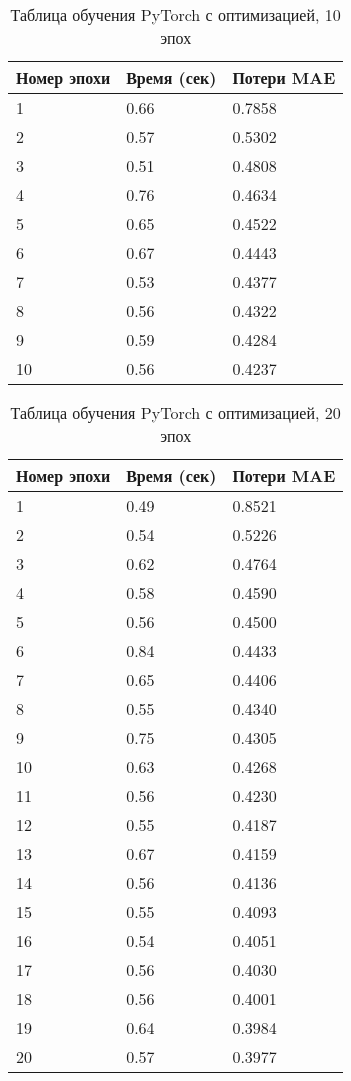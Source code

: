 \documentclass[a4paper,12pt,titlepage,final]{article}
\begin{document}
\begin{table}[H]
\centering
\begin{tabular}{|p{5.4cm}|p{3.8cm}|p{3.8cm}|}
\hline
Номер эпохи & Время (сек) & Потери MAE\\
\hline
1 & 0.66 & 0.7858 \\ [1.5ex]
\hline
2 & 0.57 & 0.5302 \\ [1.5ex]
\hline
3 & 0.51 & 0.4808 \\ [1.5ex]
\hline
4 & 0.76 & 0.4634 \\ [1.5ex]
\hline
5 & 0.65 & 0.4522 \\ [1.5ex]
\hline
6 & 0.67 & 0.4443 \\ [1.5ex]
\hline
7 & 0.53 & 0.4377 \\ [1.5ex]
\hline
8 & 0.56 & 0.4322 \\ [1.5ex]
\hline
9 & 0.59 & 0.4284 \\ [1.5ex]
\hline
10 & 0.56 & 0.4237 \\ [1.5ex]
\hline
\end{tabular}
\caption{Таблица обучения PyTorch с оптимизацией, 10 эпох}
\label{table7}
\end{table}

\begin{table}[H]
\centering
\begin{tabular}{|p{6.4cm}|p{3.2cm}|p{3.2cm}|}
\hline
Номер эпохи & Время (сек) & Потери MAE\\
\hline
1 & 0.49 & 0.8521 \\ [1.5ex]
\hline
2 & 0.54 & 0.5226 \\ [1.5ex]
\hline
3 & 0.62 & 0.4764 \\ [1.5ex]
\hline
4 & 0.58 & 0.4590 \\ [1.5ex]
\hline
5 & 0.56 & 0.4500 \\ [1.5ex]
\hline
6 & 0.84 & 0.4433 \\ [1.5ex]
\hline
7 & 0.65 & 0.4406 \\ [1.5ex]
\hline
8 & 0.55 & 0.4340 \\ [1.5ex]
\hline
9 & 0.75 & 0.4305 \\ [1.5ex]
\hline
10 & 0.63 & 0.4268 \\ [1.5ex]
\hline
11 & 0.56 & 0.4230 \\ [1.5ex]
\hline
12 & 0.55 & 0.4187 \\ [1.5ex]
\hline
13 & 0.67 & 0.4159 \\ [1.5ex]
\hline
14 & 0.56 & 0.4136 \\ [1.5ex]
\hline
15 & 0.55 & 0.4093 \\ [1.5ex]
\hline
16 & 0.54 & 0.4051 \\ [1.5ex]
\hline
17 & 0.56 & 0.4030 \\ [1.5ex]
\hline
18 & 0.56 & 0.4001 \\ [1.5ex]
\hline
19 & 0.64 & 0.3984 \\ [1.5ex]
\hline
20 & 0.57 & 0.3977 \\ [1.5ex]
\hline
\end{tabular}
\caption{Таблица обучения PyTorch с оптимизацией, 20 эпох}
\label{table11}
\end{table}
\end{document}
